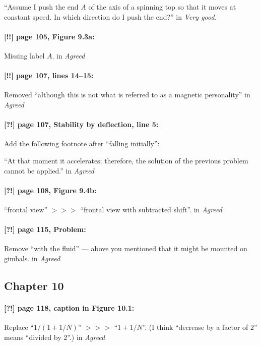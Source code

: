 \documentclass[twoside]{article}
\begin{document}
“Assume I push the end $A$ of the axis of a spinning top so that it moves at constant speed. In which direction do I push the end?”
 in {\it  Very good.} 


\paragraph{[!!] page 105, Figure 9.3a:} Missing label $A$.
 in {\it  Agreed} 

\paragraph{[!!] page 107, lines 14--15:} Removed “although this is not what is referred to as a magnetic
personality”
 in {\it  Agreed}

\paragraph{[?!] page 107, Stability by deflection, line 5:} Add the following footnote after “falling initially”:

“At that moment it accelerates; therefore, the solution of the previous problem cannot be applied.”
 in {\it  Agreed} 

\paragraph{[?!] page 108, Figure 9.4b:} “frontal view” $>\!>\!>$ “frontal view with subtracted shift”.
 in {\it  Agreed} 

\paragraph{[?!] page 115, Problem:} Remove “with the fluid” — above you mentioned that it might be mounted on gimbals.
 in {\it  Agreed} 

\subsection*{Chapter 10}

\paragraph{[?!] page 118, caption in Figure 10.1:} Replace ``$1/(1+1/N)$'' $>\!>\!>$ ``$1+1/N$''. (I think ``decrease by a factor of 2'' means ``divided by 2''.)
 in {\it  Agreed} 
\end{document}
